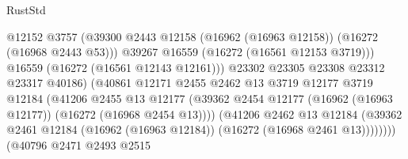 \begin{lexlean}{RustStd}
\begin{coremodule}
                                              @12152
                                              @3757
                                              (@39300
                                                @2443
                                                @12158
                                                (@16962 (@16963 @12158))
                                                (@16272 (@16968 @2443 @53)))
                                              @39267
                                              @16559
                                              (@16272 (@16561 @12153 @3719)))
                                            @16559
                                            (@16272 (@16561 @12143 @12161)))
                                          @23302
                                          @23305
                                          @23308
                                          @23312
                                          @23317
                                          @40186)
                                        (@40861
                                          @12171
                                          @2455
                                          @2462
                                          @13
                                          @3719
                                          @12177
                                          @3719
                                          @12184
                                          (@41206
                                            @2455
                                            @13
                                            @12177
                                            (@39362
                                              @2454
                                              @12177
                                              (@16962 (@16963 @12177))
                                              (@16272 (@16968 @2454 @13))))
                                          (@41206
                                            @2462
                                            @13
                                            @12184
                                            (@39362
                                              @2461
                                              @12184
                                              (@16962 (@16963 @12184))
                                              (@16272 (@16968 @2461 @13))))))))
                                  (@40796
                                    @2471
                                    @2493
                                    @2515

\end{coremodule}
\end{lexlean}
